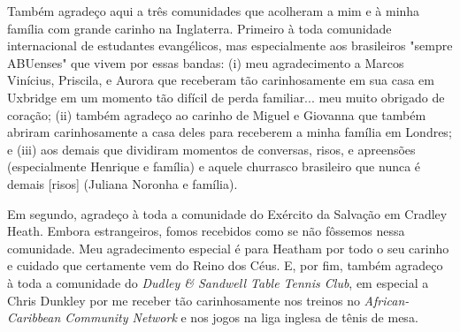 \begin{agradecimentos}
Também agradeço aqui a três comunidades que acolheram a mim e à minha família com grande carinho na Inglaterra. Primeiro à toda comunidade internacional de estudantes evangélicos, mas especialmente aos brasileiros "sempre ABUenses" que vivem por essas bandas: (i) meu agradecimento a Marcos Vinícius, Priscila, e Aurora que receberam tão carinhosamente em sua casa em Uxbridge em um momento tão difícil de perda familiar... meu muito obrigado de coração; (ii) também agradeço ao carinho de Miguel e Giovanna que também abriram carinhosamente a casa deles para receberem a minha família em Londres; e (iii) aos demais que dividiram momentos de conversas, risos, e apreensões (especialmente Henrique e família) e aquele churrasco brasileiro que nunca é demais [risos] (Juliana Noronha e família).

Em segundo, agradeço à toda a comunidade do Exército da Salvação em Cradley Heath. Embora estrangeiros, fomos recebidos como se não fôssemos nessa comunidade. Meu agrade\-cimento especial é para Heatham por todo o seu carinho e cuidado que certamente vem do Reino dos Céus. E, por fim, também agradeço à toda a comunidade do \textit{Dudley \& Sandwell Table Tennis Club}, em especial a Chris Dunkley por me receber tão carinhosamente nos treinos no \textit{African-Caribbean Community Network} e nos jogos na liga inglesa de tênis de mesa.

\end{agradecimentos}
